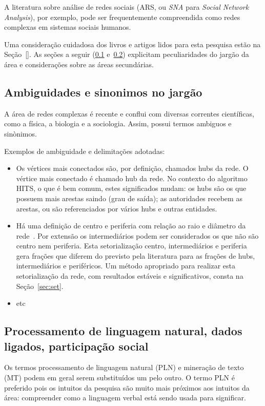 \documentclass[a4paper,openright,12pt]{report} %
\begin{document}
A literatura sobre análise de redes sociais (ARS, ou \emph{SNA} para \emph{Social Network Analysis}), por exemplo, pode ser frequentemente compreendida como redes complexas em sistemas sociais humanos.

Uma consideração cuidadosa dos livros e artigos lidos para esta pesquisa estão na Seção~\ref{}. As seções a seguir (\ref{sec:jar} e~\ref{sec:misc})
explicitam peculiaridades do jargão da área e considerações sobre as áreas secundárias.

\subsection{Ambiguidades e sinonimos no jargão}\label{sec:jar}
A área de redes complexas é recente e conflui com diversas 
correntes científicas, como a física, a biologia e a sociologia.
Assim, possui termos ambiguos e sinònimos.

Exemplos de ambiguidade e delimitações adotadas:
\begin{itemize}
	\item Os vértices mais conectados são, por definição, chamados hubs da rede. O vértice mais conectado é chamado hub da rede. No contexto do algoritmo HITS, o que é bem comum, estes significados mudam: os hubs são os que possuem mais arestas saindo (grau de saída); as autoridades recebem as arestas, ou são referenciados por vários hubs e outras entidades.
	\item Há uma definição de centro e periferia com relação ao raio e diâmetro da rede~\cite{newman,networkX}.
		Por extensão os intermediários podem ser considerados os que não são centro nem periferia.
		Esta setorialização centro, intermediários e periferia gera frações que diferem do previsto pela literatura para as frações de hubs, intermediários e periféricos.
		Um método apropriado para realizar esta setorialização da rede, com resultados estáveis e significativos, consta na Seção~\ref{sec:set}.
	\item etc
\end{itemize}

\subsection{Processamento de linguagem natural, dados ligados, participação social}\label{sec:misc}
Os termos processamento de linguagem natural (PLN) e mineração de
texto (MT) podem em geral serem substituídos um pelo outro.
O termo PLN é preferido pois os intuitos da pesquisa são muito mais
próximos aos intuitos da área: compreender como a linguagem verbal está
sendo usada para significar.
\end{document}
